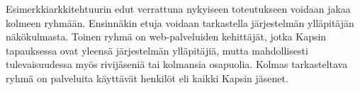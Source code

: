 Esimerkkiarkkitehtuurin edut verrattuna nykyiseen toteutukseen voidaan jakaa kolmeen ryhmään. Ensinnäkin etuja voidaan tarkastella järjestelmän ylläpitäjän näkökulmasta. Toinen ryhmä on web-palveluiden kehittäjät, jotka Kapsin tapauksessa ovat yleensä järjestelmän ylläpitäjiä, mutta mahdollisesti tulevaisuudessa myös rivijäseniä tai kolmansia osapuolia. Kolmas tarkasteltava ryhmä on palveluita käyttävät henkilöt eli kaikki Kapsin jäsenet.